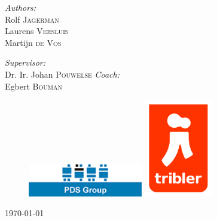 \begin{titlepage}
\begin{center}
\begin{minipage}{0.4\textwidth}
\begin{flushleft} \large
\emph{Authors:}\\
Rolf \textsc{Jagerman} \\ [0.1cm]
Laurens \textsc{Versluis} \\ [0.1cm]
Martijn \textsc{de Vos} \\ [0.1cm]
\end{flushleft}
\end{minipage}
\begin{minipage}{0.4\textwidth}
\begin{flushright} \large
\emph{Supervisor:} \\
Dr. Ir. Johan \textsc{Pouwelse}
\emph{Coach:} \\
Egbert \textsc{Bouman}
\end{flushright}
\end{minipage}
\vspace{30mm}
\begin{figure}[ht!]
\centering
\includegraphics[width=50mm]{graphics/pdslogo.png}
\hspace{10mm}
\includegraphics[width=30mm]{graphics/triblerlogo.png}
\label{overflow}
\end{figure}
\vfill

{\large \today}

\end{center}

\end{titlepage}